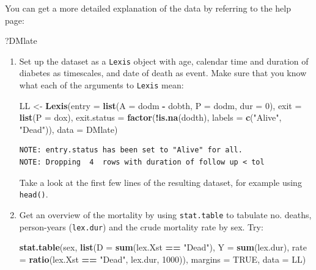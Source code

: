 \documentclass[
]{book}
\newenvironment{Shaded}{\begin{snugshade}}{\end{snugshade}}
\newcommand{\AttributeTok}[1]{\textcolor[rgb]{0.13,0.29,0.53}{#1}}
\newcommand{\ConstantTok}[1]{\textcolor[rgb]{0.56,0.35,0.01}{#1}}
\newcommand{\DecValTok}[1]{\textcolor[rgb]{0.00,0.00,0.81}{#1}}
\newcommand{\FunctionTok}[1]{\textcolor[rgb]{0.13,0.29,0.53}{\textbf{#1}}}
\newcommand{\NormalTok}[1]{#1}
\newcommand{\OtherTok}[1]{\textcolor[rgb]{0.56,0.35,0.01}{#1}}
\newcommand{\SpecialCharTok}[1]{\textcolor[rgb]{0.81,0.36,0.00}{\textbf{#1}}}
\newcommand{\StringTok}[1]{\textcolor[rgb]{0.31,0.60,0.02}{#1}}
\begin{document}
You can get a more detailed explanation of the data by referring to
the help page:

\begin{Shaded}
\begin{Highlighting}[]
\NormalTok{?DMlate}
\end{Highlighting}
\end{Shaded}

\begin{enumerate}
\def\labelenumi{\arabic{enumi}.}
\item
  Set up the dataset as a \texttt{Lexis} object with age, calendar
  time and duration of diabetes as timescales, and date of death as
  event. Make sure that you know what each of the arguments to
  \texttt{Lexis} mean:

\begin{Shaded}
\begin{Highlighting}[]
\NormalTok{LL }\OtherTok{\textless{}{-}} \FunctionTok{Lexis}\NormalTok{(}\AttributeTok{entry =} \FunctionTok{list}\NormalTok{(}\AttributeTok{A =}\NormalTok{ dodm }\SpecialCharTok{{-}}\NormalTok{ dobth, }
                         \AttributeTok{P =}\NormalTok{ dodm, }
                       \AttributeTok{dur =} \DecValTok{0}\NormalTok{),}
             \AttributeTok{exit =} \FunctionTok{list}\NormalTok{(}\AttributeTok{P =}\NormalTok{ dox),}
      \AttributeTok{exit.status =} \FunctionTok{factor}\NormalTok{(}\SpecialCharTok{!}\FunctionTok{is.na}\NormalTok{(dodth), }
                           \AttributeTok{labels =} \FunctionTok{c}\NormalTok{(}\StringTok{"Alive"}\NormalTok{, }\StringTok{"Dead"}\NormalTok{)),}
             \AttributeTok{data =}\NormalTok{ DMlate)}
\end{Highlighting}
\end{Shaded}

\begin{verbatim}
NOTE: entry.status has been set to "Alive" for all.
NOTE: Dropping  4  rows with duration of follow up < tol
\end{verbatim}

  Take a look at the first few lines of the resulting dataset, for
  example using \texttt{head()}.
\item
  Get an overview of the mortality by using \texttt{stat.table}
  to tabulate no. deaths, person-years (\texttt{lex.dur}) and the
  crude mortality rate by sex. Try:

\begin{Shaded}
\begin{Highlighting}[]
\FunctionTok{stat.table}\NormalTok{(sex,}
           \FunctionTok{list}\NormalTok{(}\AttributeTok{D =} \FunctionTok{sum}\NormalTok{(lex.Xst }\SpecialCharTok{==} \StringTok{"Dead"}\NormalTok{),}
                \AttributeTok{Y =} \FunctionTok{sum}\NormalTok{(lex.dur),}
             \AttributeTok{rate =} \FunctionTok{ratio}\NormalTok{(lex.Xst }\SpecialCharTok{==} \StringTok{"Dead"}\NormalTok{, }
\NormalTok{                          lex.dur, }
                          \DecValTok{1000}\NormalTok{)),}
          \AttributeTok{margins =} \ConstantTok{TRUE}\NormalTok{,}
             \AttributeTok{data =}\NormalTok{ LL)}
\end{Highlighting}
\end{Shaded}


\end{enumerate}
\end{document}
